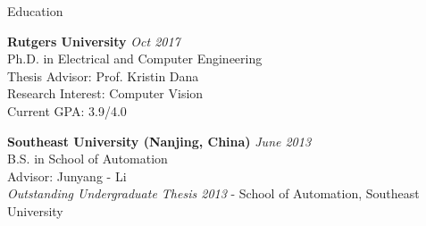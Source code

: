 \documentclass{resume} %
\begin{document}



\begin{rSection}{Education}

{\bf Rutgers University} \hfill {\em Oct 2017} \\
Ph.D. in Electrical and Computer Engineering \\
Thesis Advisor: Prof. Kristin Dana \\
Research Interest: Computer Vision\\
Current GPA: 3.9/4.0

{\bf Southeast University (Nanjing, China)} \hfill {\em June 2013} \\
B.S. in School of Automation \\
Advisor: Junyang - Li \\
 {\it Outstanding Undergraduate Thesis 2013} - School of Automation, Southeast University%
\end{rSection}

\newcommand{\RNum}[1]{\uppercase\expandafter{\romannumeral #1\relax}}
\end{document}
